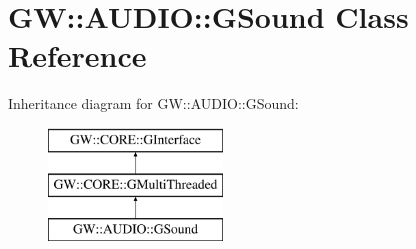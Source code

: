\hypertarget{class_g_w_1_1_a_u_d_i_o_1_1_g_sound}{}\section{GW\+:\+:A\+U\+D\+IO\+:\+:G\+Sound Class Reference}
\label{class_g_w_1_1_a_u_d_i_o_1_1_g_sound}
Inheritance diagram for GW\+:\+:A\+U\+D\+IO\+:\+:G\+Sound\+:\begin{figure}[H]
\begin{center}
\leavevmode
\includegraphics[height=3.000000cm]{class_g_w_1_1_a_u_d_i_o_1_1_g_sound}
\end{center}
\end{figure}
